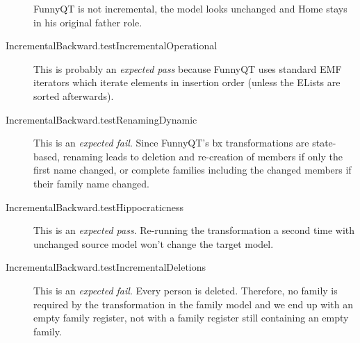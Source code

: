 \documentclass[a4paper]{article}
\begin{document}
\begin{description}
  FunnyQT is not incremental, the model looks unchanged and Home stays in his
  original father role.
\item[IncrementalBackward.testIncrementalOperational] This is probably an
  \emph{expected pass} because FunnyQT uses standard EMF iterators which
  iterate elements in insertion order (unless the ELists are sorted
  afterwards).
\item[IncrementalBackward.testRenamingDynamic] This is an \emph{expected fail}.
  Since FunnyQT's bx transformations are state-based, renaming leads to
  deletion and re-creation of members if only the first name changed, or
  complete families including the changed members if their family name changed.
\item[IncrementalBackward.testHippocraticness] This is an \emph{expected pass}.
  Re-running the transformation a second time with unchanged source model won't
  change the target model.
\item[IncrementalBackward.testIncrementalDeletions] This is an \emph{expected
    fail}.  Every person is deleted.  Therefore, no family is required by the
  transformation in the family model and we end up with an empty family
  register, not with a family register still containing an empty family.
\end{description}




\end{document}
